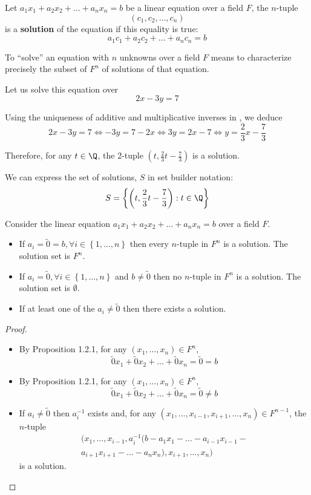 \begin{definition}[Solution]\label{def:solution}
    Let $a_1x_1+a_2x_2+\ldots+a_nx_n=b$ be a linear equation over a field $F$, the $n$-tuple 
    \[
    \left(c_1,c_2,\ldots,c_n\right)
    \]
    is a \textbf{solution} of the equation if this equality is true:
    \[
    a_1c_1+a_2c_2+\ldots+a_nc_n=b
    \]
    
\end{definition}

To ``solve'' an equation with $n$ unknowns over a field $F$ means to characterize precisely the subset of $F^n$ of solutions of that equation.
\begin{eg}
    Let us solve this equation over \Q
    \[
    2x-3y=7
    \]

    Using the uniqueness of additive and multiplicative inverses in \Q, we deduce
    \[2x-3y=7 \iff -3y=7-2x \iff 3y=2x-7 \iff y=\frac{2}{3}x-\frac{7}{3}\]

    Therefore, for any $t \in \Q$, the 2-tuple $\left(t,\frac{2}{3}t-\frac{7}{3}\right)$ is a solution.
    
    We can express the set of solutions, $S$ in set builder notation:
    \[
    S=\left\{\left(t,\frac{2}{3}t-\frac{7}{3}\right) : t \in \Q \right\}
    \]
\end{eg}

\begin{proposition}
    Consider the linear equation $a_1x_1+a_2x_2+\ldots+a_nx_n=b$ over a field $F$.
    \begin{itemize}
        \item If $a_i=\tilde{0}=b,\forall i \in \left\{1,\ldots,n\right\}$ then every $n$-tuple in $F^n$ is a solution. The solution set is $F^n$.
        \item If $a_i=\tilde{0},\forall i \in \left\{1,\ldots,n\right\}$ and $b \neq \tilde{0}$ then no $n$-tuple in $F^n$ is a solution. The solution set is $\emptyset$.
        \item If at least one of the $a_i \neq \tilde{0}$ then there exists a solution.
    \end{itemize}
\end{proposition}
\begin{proof}
    \begin{itemize}
        \item By Proposition 1.2.1, for any $\left(x_1,\ldots,x_n\right) \in F^n$,
        \[
        \tilde{0}x_1+\tilde{0}x_2+\ldots+\tilde{0}x_n=\tilde{0}=b
        \]
        \item By Proposition 1.2.1, for any $\left(x_1,\ldots,x_n\right) \in F^n$,
        \[
        \tilde{0}x_1+\tilde{0}x_2+\ldots+\tilde{0}x_n=\tilde{0} \neq b
        \]
        \item If $a_i \neq \tilde{0}$ then $a_i^{-1}$ exists and, for any $\left(x_1,\ldots,x_{i-1},x_{i+1},\ldots,x_n\right) \in F^{n-1}$, the $n$-tuple
        \begin{multline*}
            (x_1,\ldots,x_{i-1},a_i^{-1}(b-a_1x_1-\ldots-a_{i-1}x_{i-1}-\\a_{i+1}x_{i+1}-\ldots-a_nx_n),x_{i+1},\ldots,x_n)
        \end{multline*}
        is a solution. 
    \end{itemize}
\end{proof}
